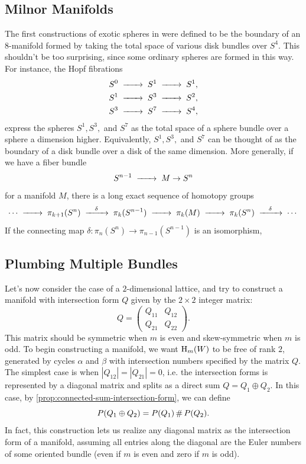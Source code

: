\subsection{Milnor Manifolds}

The first constructions of exotic spheres in \cite{milnor1956manifolds} were defined to be the boundary of an $8$-manifold formed by taking the total space of various disk bundles over $S^4$. This shouldn't be too surprising, since some ordinary spheres are formed in this way. For instance, the Hopf fibrations
\[
	\begin{aligned}
		S^0 \lkxto S^1 \lkxto S^1, \\
		S^1 \lkxto S^3 \lkxto S^2, \\
		S^3 \lkxto S^7 \lkxto S^4, \\
	\end{aligned}
\]
express the spheres $S^1, S^3,$ and $S^7$ as the total space of a sphere bundle over a sphere a dimension higher. Equivalently, $S^1, S^3,$ and $S^7$ can be thought of as the boundary of a disk bundle over a disk of the same dimension. More generally, if we have a fiber bundle
\[
	S^{n-1} \lkxto M \to S^n
\]
for a manifold $M$, there is a long exact sequence of homotopy groups
\[
	\cdots \lkxto \pi_{k+1}(S^{n}) \lkxto[\delta] \pi_k(S^{n-1}) \lkxto \pi_k(M) \lkxto \pi_{k}(S^{n})\lkxto[\delta] \cdots
\]
If the connecting map $\delta : \pi_{n}(S^n) \to \pi_{n-1}(S^{n-1})$ is an isomorphism,


\begin{definition}
\end{definition}

\subsection{Plumbing Multiple Bundles}

Let's now consider the case of a $2$-dimensional lattice, and try to construct a manifold with intersection form $Q$ given by the $2\times 2$ integer matrix:
\[
	Q = \begin{pmatrix} Q_{11} & Q_{12} \\ Q_{21} & Q_{22}\end{pmatrix}.
\]
This matrix should be symmetric when $m$ is even and skew-symmetric when $m$ is odd. To begin constructing a manifold, we want $\operatorname{H}_m(W)$ to be free of rank $2$, generated by cycles $\alpha$ and $\beta$ with intersection numbers specified by the matrix $Q$. The simplest case is when $|Q_{12}|=|Q_{21}|=0$, i.e. the intersection forms is represented by a diagonal matrix and splits as a direct sum $Q=Q_1\oplus Q_2$. In this case, by \cref{prop:connected-sum-intersection-form}, we can define
\[
	P(Q_1\oplus Q_2) = P(Q_1)\,\#\, P(Q_2).
\]
In fact, this construction lets us realize any diagonal matrix as the intersection form of a manifold, assuming all entries along the diagonal are the Euler numbers of some oriented bundle (even if $m$ is even and zero if $m$ is odd).

